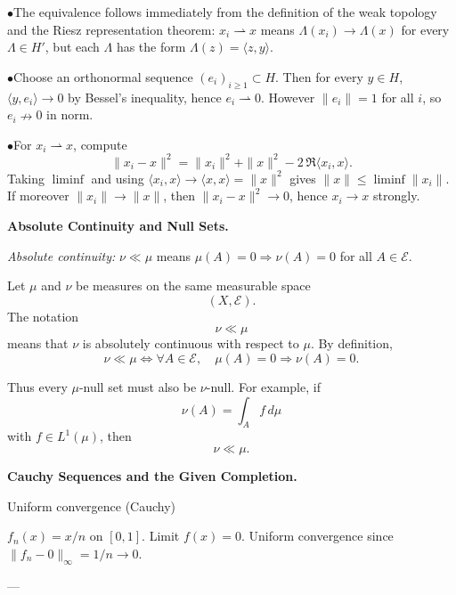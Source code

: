 \begin{solution}
\par\smallskip\noindent\(\bullet\)\quad The equivalence follows immediately from the definition of the weak topology
		and the Riesz representation theorem:
		$x_i\rightharpoonup x$ means
		$\Lambda(x_i)\to\Lambda(x)$ for every $\Lambda\in H'$,
		but each $\Lambda$ has the form $\Lambda(z)=\langle z,y\rangle$.

		\par\smallskip\noindent\(\bullet\)\quad Choose an orthonormal sequence $(e_i)_{i\ge1}\subset H$.
		Then for every $y\in H$,
		$\langle y,e_i\rangle\to0$ by Bessel's inequality,
		hence $e_i\rightharpoonup0$.
		However $\|e_i\|=1$ for all $i$,
		so $e_i\nrightarrow0$ in norm.

		\par\smallskip\noindent\(\bullet\)\quad For $x_i\rightharpoonup x$, compute
		\[
		\|x_i-x\|^2=\|x_i\|^2+\|x\|^2-2\,\Re\langle x_i,x\rangle .
		\]
		Taking $\liminf$ and using
		$\langle x_i,x\rangle\to\langle x,x\rangle=\|x\|^2$ gives
		$\|x\|\le\liminf\|x_i\|$.
		If moreover $\|x_i\|\to\|x\|$, then
		$\|x_i-x\|^2\to0$,
		hence $x_i\to x$ strongly.
\end{solution}

\begin{problem}[CP-II-0463]
\label{prob:cp-ii-0463}
\textbf{Absolute Continuity and Null Sets.}

\hspace*{1.5em}\emph{Absolute continuity:} $\nu\ll\mu$ means $\mu(A)=0 \Rightarrow \nu(A)=0$ for all $A\in\mathcal E$.
\end{problem}

\begin{solution}
Let \(\mu\) and \(\nu\) be measures on the same measurable space
\[
(X,\mathcal E).
\]
The notation
\[
\nu\ll\mu
\]
means that \(\nu\) is absolutely continuous with respect to \(\mu\). By definition,
\[
\boxed{
\nu\ll\mu
\iff
\forall A\in\mathcal E,\quad
\mu(A)=0
\Longrightarrow
\nu(A)=0.
}
\]

Thus every \(\mu\)-null set must also be \(\nu\)-null. For example, if
\[
\nu(A)=\int_A f\,d\mu
\]
with \(f\in L^1(\mu)\), then
\[
\nu\ll\mu.
\]
\end{solution}


\begin{problem}[CP-II-0465]
\label{prob:cp-ii-0465}
\textbf{Cauchy Sequences and the Given Completion.}

\hspace*{1.5em}Uniform convergence (Cauchy)

$f_n(x)=x/n$ on $[0,1]$. Limit $f(x)=0$.
Uniform convergence since $\|f_n-0\|_\infty=1/n \to 0$.

---
\end{problem}

